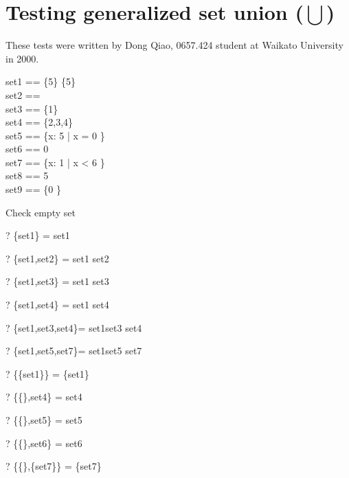 \documentclass{article}
\begin{document}
\section{Testing generalized set union ($\bigcup$)}
These tests were written by Dong Qiao, 0657.424 student at Waikato 
University in 2000.
\begin{zed}
set1 == \{5\} \setminus \{5\} \\      %
set2 == \emptyset[\nat] \\            %
set3 == \{1\} \\                %
set4 == \{2,3,4\} \\            %
set5 == \{x: 5  | x  = 0 \} \\ %
set6 == 0   \\
set7 == \{x: 1  | x < 6 \} \\  %
set8 == 5  \\
set9 == \{0 \} \\
\end{zed}

Check empty set
\begin{zed}\vdash? \bigcup \{set1\}        = set1 \end{zed}
\begin{zed}\vdash? \bigcup \{set1,set2\}   = set1 \cup set2 \end{zed}
\begin{zed}\vdash? \bigcup \{set1,set3\}   = set1 \cup set3 \end{zed}
\begin{zed}\vdash? \bigcup \{set1,set4\}   = set1 \cup set4 \end{zed}
\begin{zed}\vdash? \bigcup\{set1,set3,set4\}= set1\cup set3 \cup set4\end{zed}
\begin{zed}\vdash? \bigcup\{set1,set5,set7\}= set1\cup set5 \cup set7\end{zed}
\begin{zed}\vdash? \bigcup \{\{set1\}\}      = \{set1\} \end{zed}
\begin{zed}\vdash? \bigcup \{\{\},set4\}     = set4 \end{zed}
\begin{zed}\vdash? \bigcup \{\{\},set5\}     = set5 \end{zed}
\begin{zed}\vdash? \bigcup \{\{\},set6\}     = set6 \end{zed}
\begin{zed}\vdash? \bigcup \{\{\},\{set7\}\} = \{set7\} \end{zed}
\end{document}
